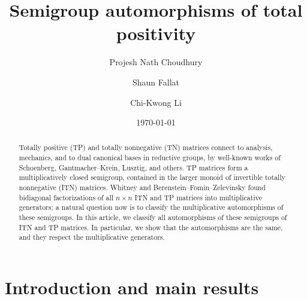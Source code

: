 \documentclass[11pt,reqno]{amsart}
\theoremstyle{plain}
\theoremstyle{definition}
\numberwithin{equation}{section}
\begin{document}
\title[Semigroup automorphisms of total positivity]{Semigroup automorphisms of total positivity}

\author{Projesh Nath Choudhury}
\address[P.N.~Choudhury]{Department of Mathematics, Indian Institute of Technology Gandhinagar, Palaj, Gandhinagar
	Gujarat 382355, India}

\author{Shaun Fallat}
\address[S. Fallat]{University of Regina, Regina, SK, Canada}

\author{Chi-Kwong Li}
\address[C.K. Li]{Department of Mathematics, College of William and Mary, Williamsburg, VA 23187-8793, USA}

\date{\today}

\begin{abstract}
Totally positive (TP) and totally nonnegative (TN) matrices connect to analysis, mechanics, and to dual canonical bases in reductive groups, by well-known works of Schoenberg, Gantmacher--Krein, Lusztig, and others. TP matrices form a multiplicatively closed semigroup, contained in the larger monoid of invertible totally nonnegative (ITN) matrices. Whitney and Berenstein--Fomin--Zelevinsky found bidiagonal factorizations  of all  $n\times n$ ITN and TP matrices into multiplicative generators; a natural question now is to classify the multiplicative automorphisms of these semigroups.	In this article, we classify all automorphisms of these semigroups of ITN and TP matrices. In particular, we show that the automorphisms are the same, and they respect the multiplicative generators.	

\end{abstract}



\maketitle



\section{Introduction and main results}
\end{document}
